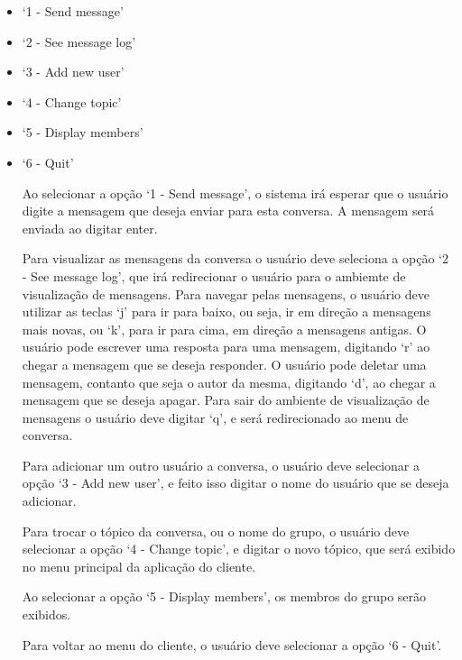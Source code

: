 \documentclass{article}
\begin{document}
\begin{enumerate}
\begin{itemize}

\item `1 - Send message'

\item `2 - See message log'

\item `3 - Add new user'

\item `4 - Change topic'

\item `5 - Display members'

\item `6 - Quit'

Ao selecionar a opção `1 - Send message', o sistema irá esperar que o usuário digite a mensagem que deseja enviar para esta conversa. A mensagem será enviada ao digitar enter.

Para visualizar as mensagens da conversa o usuário deve seleciona a opção `2 - See message log', que irá redirecionar o usuário para o ambiemte de visualização de mensagens. Para navegar pelas mensagens, o usuário deve utilizar as teclas `j' para ir para baixo, ou seja, ir em direção a mensagens mais novas, ou `k', para ir para cima, em direção a mensagens antigas. O usuário pode escrever uma resposta para uma mensagem, digitando `r' ao chegar a mensagem que se deseja responder. O usuário pode deletar uma mensagem, contanto que seja o autor da mesma, digitando `d', ao chegar a mensagem que se deseja apagar. Para sair do ambiente de visualização de mensagens o usuário deve digitar `q', e será redirecionado ao menu de conversa.

Para adicionar um outro usuário a conversa, o usuário deve selecionar a opção `3 - Add new user', e feito isso digitar o nome do usuário que se deseja adicionar.

Para trocar o tópico da conversa, ou o nome do grupo, o usuário deve selecionar a opção `4 - Change topic', e digitar o novo tópico, que será exibido no menu principal da aplicação do cliente.

Ao selecionar a opção `5 - Display members', os membros do grupo serão exibidos.

Para voltar ao menu do cliente, o usuário deve selecionar a opção `6 - Quit'.

\end{itemize}


\end{enumerate}

 
\end{document}
